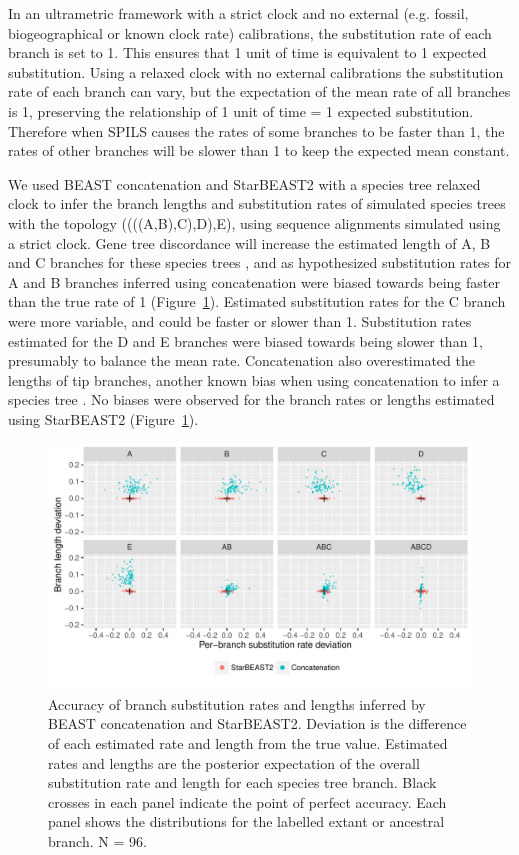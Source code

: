 \documentclass[nogrid]{MBE}%
\begin{document}
In an ultrametric framework with a strict clock and no external (e.g. fossil,
biogeographical or known clock rate)
calibrations, the substitution rate of each branch is set to 1. This ensures that 1 unit of time
is equivalent to 1 expected substitution. Using a relaxed clock with no external calibrations
the substitution rate of each branch can vary, but the expectation of the mean rate of all
branches is 1, preserving the relationship of 1 unit of time = 1 expected substitution.
Therefore when SPILS causes the rates of some branches to be faster than 1,
the rates of other branches will be slower than 1 to keep the expected mean constant.

We used BEAST concatenation and StarBEAST2 with a species tree relaxed clock to
infer the branch lengths and substitution rates of simulated species trees with
the topology ((((A,B),C),D),E), using sequence alignments simulated using a strict
clock. Gene tree discordance will increase the estimated length of A, B and C
branches for these species trees \citep{Mendes01072016}, and as hypothesized
substitution rates for A and B branches inferred using concatenation were biased
towards being faster than the true rate of 1 (Figure~\ref{fig:spilsRates}).
Estimated substitution rates for the C branch were more variable, and could be
faster or slower than 1. Substitution rates estimated for the D and E branches
were biased towards being slower than 1, presumably to balance the mean rate. Concatenation also overestimated the lengths of tip branches, another known
bias when using concatenation to infer a species tree \citep{Ogilvie01052016}. No biases were observed for the branch rates or lengths estimated using StarBEAST2
(Figure~\ref{fig:spilsRates}).

\begin{figure}[htb!]
\centering
\includegraphics[width=\textwidth]{scatter.pdf}
\caption
{Accuracy of branch substitution rates and lengths inferred by BEAST
concatenation and StarBEAST2. Deviation is the difference of each estimated
rate and length from the true value. Estimated rates and lengths are the posterior
expectation of the overall substitution rate and length for each species tree
branch. Black crosses in each panel indicate the point of perfect accuracy. Each
panel shows the distributions for the labelled extant or ancestral branch. N =
96.}
\label{fig:spilsRates}
\end{figure}
\end{document}
